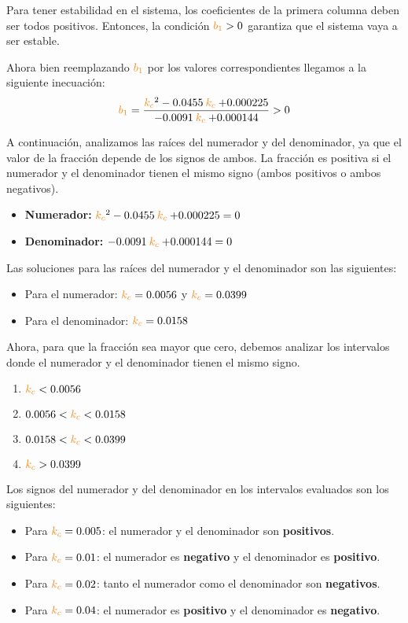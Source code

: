 Para tener estabilidad en el sistema, los coeficientes de la primera columna
deben ser todos positivos. Entonces, la condición $\nara{b_1} > 0$ garantiza
que el sistema vaya a ser estable.

Ahora bien reemplazando $\nara{b_1}$ por los valores correspondientes llegamos
a la siguiente inecuación:
\begin{equation}
    \nara{b_1} = \frac{\nara{k_c}^2  - 0.0455 \nara{k_c} + 0.000225}{-0.0091 \nara{k_c} + 0.000144} > 0
\end{equation}

A continuación, analizamos las raíces del numerador y del denominador, ya que
el valor de la fracción depende de los signos de ambos. La fracción es positiva
si el numerador y el denominador tienen el mismo signo (ambos positivos o ambos
negativos).
\begin{itemize}
    \item \textbf{Numerador:} \( \nara{k_c}^2 - 0.0455 \nara{k_c} + 0.000225 = 0 \)
    \item \textbf{Denominador:} \( -0.0091 \nara{k_c} + 0.000144 = 0 \)
\end{itemize}

Las soluciones para las raíces del numerador y el denominador son las siguientes:
\begin{itemize}
    \item Para el numerador: \( \nara{k_c} = 0.0056 \) y \( \nara{k_c} = 0.0399 \)
    \item Para el denominador: \( \nara{k_c} = 0.0158 \)
\end{itemize}

Ahora, para que la fracción sea mayor que cero, debemos analizar los intervalos
donde el numerador y el denominador tienen el mismo signo.
\begin{enumerate}
    \item \( \nara{k_c} < 0.0056 \)
    \item \( 0.0056 < \nara{k_c} < 0.0158 \)
    \item \( 0.0158 < \nara{k_c} < 0.0399 \)
    \item \( \nara{k_c} > 0.0399 \)
\end{enumerate}

Los signos del numerador y del denominador en los intervalos evaluados son los siguientes:
\begin{itemize}
    \item Para \( \nara{k_c} = 0.005 \): el numerador y el denominador son \textbf{positivos}.
    \item Para \( \nara{k_c} = 0.01 \): el numerador es \textbf{negativo} y el denominador es \textbf{positivo}.
    \item Para \( \nara{k_c} = 0.02 \): tanto el numerador como el denominador son \textbf{negativos}.
    \item Para \( \nara{k_c} = 0.04 \): el numerador es \textbf{positivo} y el denominador es \textbf{negativo}.
\end{itemize}

